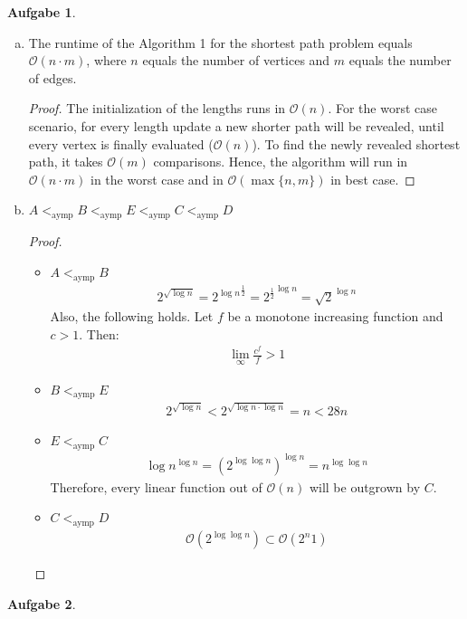 \documentclass[a4paper,12pt,headsepline]{scrartcl}
\newtheorem{aufgabe}{Aufgabe}
\begin{document}
\begin{aufgabe}
\end{aufgabe}

\begin{enumerate}[a)]
	\item The runtime of the Algorithm 1 for the shortest path problem equals $\mathcal{O}(n\cdot m)$, where $n$ equals the number of vertices and $m$ equals the number of edges.
	\begin{proof}
		The initialization of the lengths runs in $\mathcal{O}(n)$. For the worst case scenario, for every length update a new shorter path will be revealed, until every vertex is finally evaluated ($\mathcal{O}(n)$). To find the newly revealed shortest path, it takes $\mathcal{O}(m)$ comparisons. Hence, the algorithm will run in $\mathcal{O}(n\cdot m)$ in the worst case and in $\mathcal{O}(\max\{n,m\})$ in best case.
	\end{proof}
	\item $A <_{\text{aymp}} B<_{\text{aymp}} E <_{\text{aymp}} C <_{\text{aymp}} D$
	\begin{proof}
		\begin{itemize}
			\item $A <_{\text{aymp}} B$
			\begin{align*}
				 2^{\sqrt{\log n}} = {2^{\log n}}^{\frac{1}{2}} = {2^{\frac{1}{2}}}^{\log n} = \sqrt{2}^{\log n}
			\end{align*}
			Also, the following holds. Let $f$ be a monotone increasing function and $c > 1$. Then:
			\begin{align*}
				\lim\limits_{\infty}\frac{c^f}{f} > 1
			\end{align*}
			\item $B <_{\text{aymp}} E$
			\begin{align*}
				2^{\sqrt{\log n}} < 2^{\sqrt{\log n \cdot \log n}} = n < 28n
			\end{align*}
			\item $E <_{\text{aymp}} C$
			\begin{align*}
				\log n^{\log n} = (2^{\log \log n})^{\log n}= n^{\log \log n}
			\end{align*}
			Therefore, every linear function out of $\mathcal{O}(n)$ will be outgrown by $C$.
			\item $C <_{\text{aymp}} D$
			\begin{align*}
				\mathcal{O}(2^{\log \log n}) \subset \mathcal{O}(2^n1)
			\end{align*}
		\end{itemize}
	\end{proof} 
\end{enumerate}
\newpage
\begin{aufgabe}
\end{aufgabe}
\end{document}
